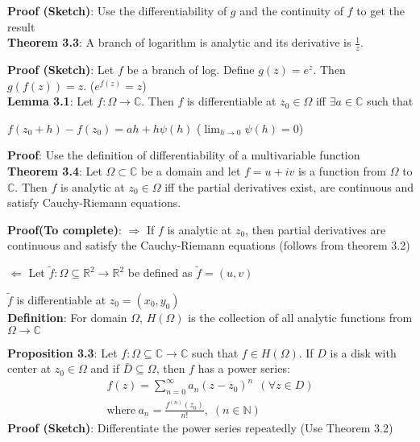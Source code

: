 \documentclass{article}
\begin{document}
\begin{flushleft}
\textbf{Proof (Sketch)}: Use the differentiability of $g$ and the continuity of $f$ to get the result \\
\vspace{3mm}
\textbf{Theorem 3.3}: A branch of logarithm is analytic and its derivative is $\frac{1}{z}$.

\textbf{Proof (Sketch)}: Let $f$ be a branch of log. Define $g(z)=e^z$. Then $g(f(z))=z$. ($e^{f(z)}=z$)\\
\vspace{3mm}
\textbf{Lemma 3.1}: Let $f:\Omega \rightarrow \mathds{C}$. Then $f$ is differentiable at $z_0\in \Omega$ iff $\exists a\in \mathds{C}$ such that 

$f(z_0+h)-f(z_0)= ah+h\psi(h)$ ($\lim_{h \to 0} \psi(h)=0$)

\textbf{Proof}: Use the definition of differentiability of a multivariable function\\
\vspace{3mm}
\textbf{Theorem 3.4}: Let $\Omega \subset \mathds{C}$ be a domain and let $f=u+iv$ is a function from $\Omega$ to $\mathds{C}$.
Then $f$ is analytic at $z_0\in \Omega$ iff the partial derivatives exist, are continuous and satisfy Cauchy-Riemann equations.

\textbf{Proof(To complete)}: $\Rightarrow$ If $f$ is analytic at $z_0$, then partial derivatives are continuous and satisfy the Cauchy-Riemann equations (follows from theorem 3.2)

$\Leftarrow$ Let $\tilde{f}:\Omega \subseteq \mathds{R}^2\rightarrow \mathds{R}^2$ be defined as $\tilde{f}=(u,v)$

$\tilde{f}$ is differentiable at $z_0=(x_0,y_0)$\\
\vspace{3mm}
\textbf{Definition}: For domain $\Omega$, $H(\Omega)$ is the collection of all analytic functions from $\Omega \rightarrow \mathds{C}$

\textbf{Proposition 3.3}: Let $f:\Omega\subseteq \mathds{C} \rightarrow \mathds{C}$ such that $f\in H(\Omega)$. If $D$ is a disk with center at $z_0\in \Omega$ and if $\bar{D}\subseteq \Omega$, then $f$ has a power series:
\begin{align}
f(z)=\sum_{n=0}^{\infty} a_n(z-z_0)^n \:\:(\forall z\in D) \nonumber\\
\text{where}\: a_n=\frac{f^{(n)}(z_0)}{n!}\text{,}\:\: (n\in \mathds{N})\nonumber
\end{align}
\textbf{Proof (Sketch)}: Differentiate the power series repeatedly (Use Theorem 3.2)


\end{flushleft}
\end{document}
